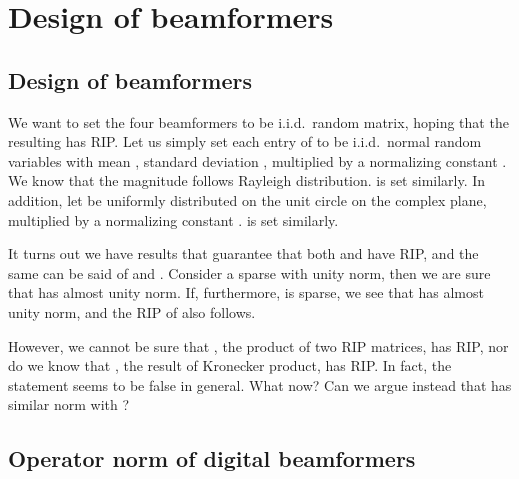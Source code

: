 \section {Design of beamformers}

\subsection {Design of beamformers}

We want to set the four beamformers to be i.i.d.\ random matrix, hoping that the resulting  has RIP.
Let us simply set each entry of  to be i.i.d.\ normal random variables with mean , standard deviation , multiplied by a normalizing constant .
We know that the magnitude  follows Rayleigh distribution.
 is set similarly.
In addition, let  be uniformly distributed on the unit circle on the complex plane, multiplied by a normalizing constant .
 is set similarly.

It turns out we have results that guarantee that both  and  have RIP, and the same can be said of  and .
Consider a sparse  with unity norm, then we are sure that  has almost unity norm.
If, furthermore,  is sparse, we see that  has almost unity norm, and the RIP of  also follows.

However, we cannot be sure that , the product of two RIP matrices, has RIP, nor do we know that , the result of Kronecker product, has RIP.
In fact, the statement seems to be false in general.
What now?
Can we argue instead that  has similar norm with ?



\subsection {Operator norm of digital beamformers}


